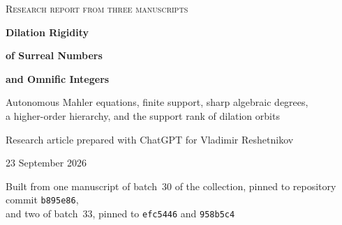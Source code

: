 \documentclass[11pt,letterpaper]{article}
\numberwithin{equation}{section}
\theoremstyle{definition}
\theoremstyle{remark}
\begin{document}
\hypersetup{pageanchor=false}
\begin{titlepage}
{\large\scshape\color{Olive} Research report from three manuscripts\par}
\vspace{0.14in}
{\Huge\bfseries Dilation Rigidity\par}
\vspace{0.06in}
{\LARGE\bfseries of Surreal Numbers\par}
\vspace{0.04in}
{\LARGE\bfseries and Omnific Integers\par}
\vspace{0.12in}
{\large Autonomous Mahler equations, finite support, sharp algebraic
degrees,\\ a higher-order hierarchy, and the support rank of dilation
orbits\par}
\vspace{0.12in}
{Research article prepared with ChatGPT for Vladimir Reshetnikov\par}
\vspace{0.04in}
{23 September 2026\par}
\vspace{0.02in}
{\small Built from one manuscript of batch~30 of the collection, pinned to
repository commit \texttt{b895e86},\\ and two of batch~33, pinned to
\texttt{efc5446} and \texttt{958b5c4}\par}
\vspace{0.08in}
\begin{abstract}
For an integer $d\ge2$, exponent dilation sends
$\sum a_\gamma t^\gamma$ to $\sum a_\gamma t^{d\gamma}$.
We prove that a nonconstant Hahn series algebraically dependent with its
own dilate over the constant field must belong to a single ordinary Laurent
series subfield. This holds in characteristic zero over every ordered
abelian value group, without an Archimedean or divisibility assumption.
If $F(y,S_dy)=0$, the necessary ramification is at most $\deg_YF$.
The proof combines Newton--Puiseux branches with a formal B\"ottcher
coordinate and a least-support-term argument; every evaluation is justified
by strong Hahn summability, not by a contraction principle.

For the negative-support ring this becomes an exact classification:
first-order autonomous algebraic dependence occurs precisely for polynomials
in one monomial. The least degree in the dilated variable is exactly the
degree in the primitive monomial. Consequently every infinite-support
omnific integer is algebraically independent of each of its nontrivial
integer dilates. We also obtain a finite-profile description for a fixed
algebraic equation, an exact Newton-weight existence test, complete
rational-map solutions, and a sharp infinitesimal-tail obstruction to
omnific solutions. Higher order behaves differently: an infinite-support
omnific integer has exact autonomous order two, and examples realize every
finite order. A research agenda identifies the remaining classification,
effectivity, positive-characteristic, and formalization problems.


\end{abstract}
\end{titlepage}
\end{document}
